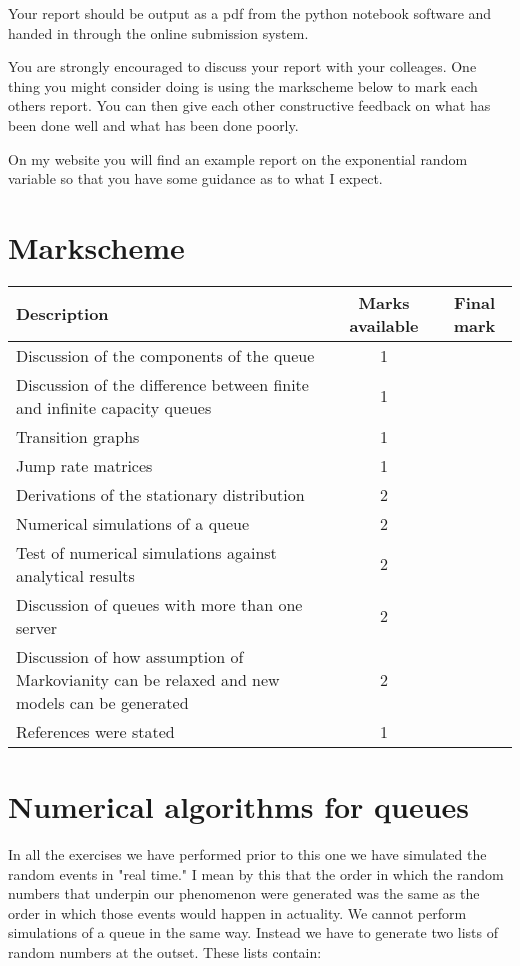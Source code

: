 \documentclass[paper=a4, fontsize=11pt]{scrartcl}
\numberwithin{equation}{section}
\numberwithin{figure}{section}
\numberwithin{table}{section}
\begin{document}
Your report should be output as a pdf from the python notebook software and handed in through the online submission system.

You are strongly encouraged to discuss your report with your colleages.  One thing you might consider doing is using the markscheme below to mark each others report.  You can then give each other 
constructive feedback on what has been done well and what has been done poorly.

On my website you will find an example report on the exponential random variable so that you have some guidance as to what I expect.

\section{Markscheme}

\begin{center}
\begin{tabular}{ l | c | c }
Description & Marks available & Final mark \\ \hline
Discussion of the components of the queue & 1 & \\
Discussion of the difference between finite and infinite capacity queues & 1 & \\
Transition graphs & 1 & \\
Jump rate matrices & 1 & \\
Derivations of the stationary distribution & 2 & \\
Numerical simulations of a queue & 2 & \\
Test of numerical simulations against analytical results & 2 & \\
Discussion of queues with more than one server & 2 & \\
Discussion of how assumption of Markovianity can be relaxed and new models can be generated & 2 & \\
References were stated & 1 
\end{tabular}
\end{center}

\section{Numerical algorithms for queues}

In all the exercises we have performed prior to this one we have simulated the random events in "real time."  I mean by this 
that the order in which the random numbers that underpin our phenomenon were generated was the same as the order in which 
those events would happen in actuality.  We cannot perform simulations of a queue in the same way.  Instead we have to generate
two lists of random numbers at the outset.  These lists contain:
\end{document}
